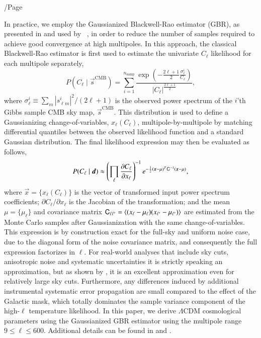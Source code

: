 /Page\documentclass[twocolumn]{aa}
\renewcommand{\d}[0]{\vec{d}}
\newcommand{\x}[0]{\vec{x}}
\newcommand{\s}[0]{\vec{s}}
\newcommand{\Cp}[0]{\tens{C}}
\begin{document}
In practice, we employ the Gaussianized Blackwell-Rao estimator (GBR),
as presented in \citet{rudjord:2009} and used by
\Planck\ \citep{planck2016-l05}, in order to reduce the number of
samples required to achieve good convergence at high
multipoles. In this approach, the classical Blackwell-Rao estimator is
first used to estimate the univariate $C_{\ell}$ likelihood for each
multipole separately,
\begin{equation}
  P(C_{\ell}\mid\s^{\mathrm{CMB}}) =
  \sum_{i = 1}^{n_{\mathrm{samp}}} \frac{\exp({-\frac{2\ell+1}{2}\frac{\sigma^i_{\ell}}{C_{\ell}}})}{|C_{\ell}|^{\frac{2\ell+1}{2}}},
\end{equation}
where $\sigma^i_{\ell} \equiv \sum_{m} |s^i_{\ell m}|^2/(2\ell+1)$ is
the observed power spectrum of the $i$'th Gibbs sample CMB sky map,
$\s^{\mathrm{CMB}}$. This distribution is used to define a
Gaussianizing change-of-variables, $x_{\ell}(C_{\ell})$,
multipole-by-multipole by matching differential quantiles between the
observed likelihood function and a standard Gaussian distribution. The
final likelihood expression may then be evaluated as follows,
\begin{equation}
  \label{eq:GBR}
  P(C_\ell\mid\d)\approx \left(\prod_\ell\frac{\partial C_\ell}{\partial x_\ell}
  \right)^{-1} e^{-\frac{1}{2}(\x-\mu)^T\Cp^{-1}(\x-\mu)},
\end{equation}
where $\x=\lbrace x_\ell(C_{\ell})\rbrace$ is the vector of transformed
input power spectrum coefficients; $\partial C_\ell/\partial x_\ell$
is the Jacobian of the transformation; and the mean
$\mu=\lbrace\mu_\ell\rbrace$ and covariance matrix $\Cp_{\ell\ell'}=
\langle (x_\ell-\mu_\ell)(x_{\ell'}-\mu_{\ell'})\rangle$ are estimated
from the Monte Carlo samples after Gaussianization with the same
change-of-variables. This expression is by construction exact for the
full-sky and uniform noise case, due to the diagonal form of the noise
covariance matrix, and consequently the full expression factorizes in
$\ell$. For real-world analyses that include sky cuts, anisotropic noise
and systematic uncertainties it is strictly speaking an approximation,
but as shown by \citet{rudjord:2009}, it is an excellent approximation
even for relatively large sky cuts. Furthermore, any differences
induced by additional instrumental systematic error propagation are
small compared to the effect of the Galactic mask, which totally
dominates the sample variance component of the high-$\ell$ temperature
likelihood. In this paper, we derive $\Lambda$CDM cosmological
parameters using the Gaussianized GBR estimator using the multipole
range $9\le\ell\le 600$. Additional details can be found in
\citet{bp01} and \citet{bp11}.
\end{document}
